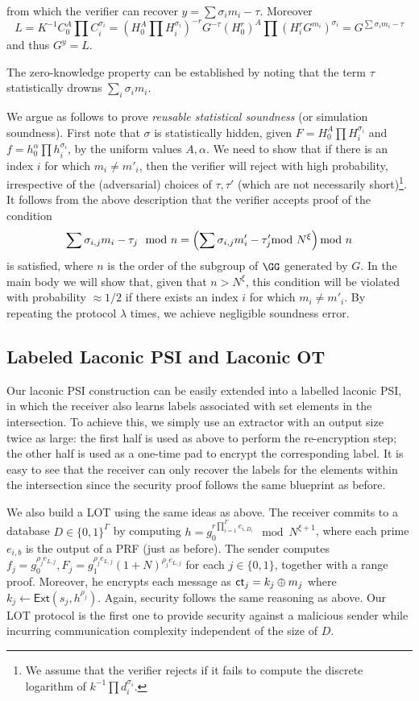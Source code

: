 from which the verifier can recover $y=\sum \sigma_i m_i-\tau$. Moreover
\[
L=K^{-1}C_0^A\prod C_i^{\sigma_i}= \left(H_0^A\prod H_i^{\sigma_i}\right)^{-r} G^{-\tau}\left(H_0^{r}\right)^A \prod (H_i^rG^{m_i})^{\sigma_i}=G^{\sum \sigma_i m_i-\tau}
\]
and thus $G^y=L$.
 
The zero-knowledge property can be established by noting that the term $\tau$ statistically drowns $\sum_i \sigma_i m_i$. 

We argue as follows to prove \emph{reusable statistical soundness} (or simulation soundness). First note that $\sigma$ is statistically hidden, given  $F=H_0^A\prod H_i^{\sigma_i}$ and $f=h_0^\alpha\prod h_i^{\sigma_i}$, by the uniform values $A,\alpha$. We need to show that if there is an index $i$ for which $m_i \neq m'_i$, then the verifier will reject with high probability, irrespective of the (adversarial) choices of $\tau,\tau'$ (which are not necessarily short)\footnote{We assume that the verifier rejects if it fails to compute the discrete logarithm of $k^{-1}\prod d_i^{\sigma_i}$.}. It follows from the above description that the verifier accepts proof of the condition
\[
\sum \sigma_{i,j} m_i - \tau_j \mod n=\left( \sum \sigma_{i,j}m_i' -\tau'_j \smod N^{\xi} \right)\smod n
\]
is satisfied, where $n$ is the order of the subgroup of $\GG$ generated by $G$. In the main body we will show that, given that $n > N^{\xi}$, this condition will be violated with probability $\approx 1/2$ if there exists an index $i$ for which $m_i \neq m'_i$. By repeating the protocol $\lambda$ times, we achieve negligible soundness error.


\subsection{Labeled Laconic PSI and Laconic OT}
Our laconic PSI construction  can be easily extended into a labelled laconic PSI, in which the receiver also learns labels associated with set elements in the intersection. To achieve this, we simply use an extractor with an output size twice as large: the first half is used as above to perform the re-encryption step; the other half is used as a one-time pad to encrypt the corresponding label. It is easy to see that the receiver can only recover the labels for the elements within the intersection since the security proof follows the same blueprint as before.

We also build a LOT using the same ideas as above. The receiver commits to a database $D\in\{0,1\}^\Gamma$ by computing $h=g_0^{r\prod_{i=1}^\Gamma e_{i, D_i}}\mod N^{\xi+1}$, where each prime $e_{i,b}$ is the output of a PRF (just as before). The sender computes $f_j=g_0^{\rho_j e_{L,j}}, F_j=g_1^{\rho_j e_{L,j}}(1+N)^{\rho_j e_{L,j}}$ for each $j\in\{0,1\}$, together with a range proof. Moreover, he encrypts each message as $\mathsf{ct}_j=k_j\oplus m_j$ where $k_j\leftarrow\mathsf{Ext}(s_j, h^{\rho_j})$. Again, security follows the same reasoning as above. Our LOT protocol is the first one to provide security against a malicious sender while incurring communication complexity independent of the size of $D$.



